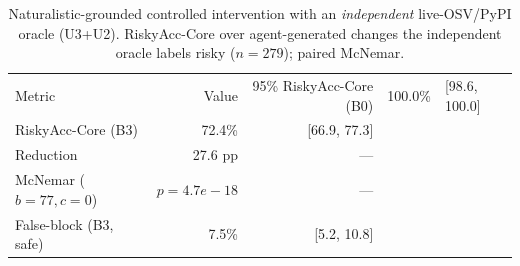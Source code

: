 \begin{table}[t]\centering
\caption{Naturalistic-grounded controlled intervention with an \emph{independent} live-OSV/PyPI oracle (U3+U2). RiskyAcc-Core over agent-generated changes the independent oracle labels risky ($n=279$); paired McNemar.}
\label{tab:e1a-indep}
\begin{tabular}{lrr}
\toprule
Metric & Value & 95\%%
\midrule
RiskyAcc-Core (B0) & 100.0\% & [98.6, 100.0] \\
RiskyAcc-Core (B3) & 72.4\% & [66.9, 77.3] \\
Reduction & 27.6 pp & --- \\
McNemar ($b{=}77,c{=}0$) & $p{=}4.7e-18$ & --- \\
False-block (B3, safe) & 7.5\% & [5.2, 10.8] \\
\bottomrule
\end{tabular}
\end{table}
